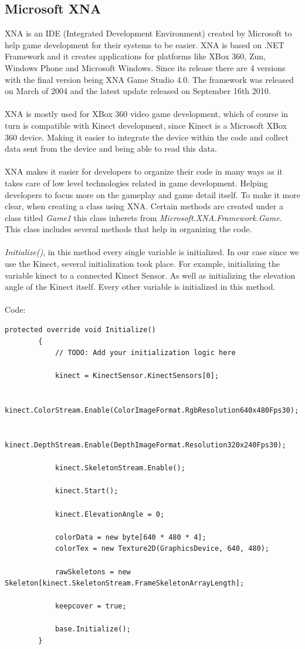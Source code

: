 \documentclass[11pt]{article} %
\begin{document}
\subsection{Microsoft XNA}
XNA is an IDE (Integrated Development Environment) created by Microsoft to help game development for their systems to be easier. XNA is based on .NET Framework and it creates applications for platforms like XBox 360, Zun, Windows Phone and Microsoft Windows. Since its release there are 4 versions with the final version being XNA Game Studio 4.0. The framework was released on March of 2004 and the latest update released on September 16th 2010. 
\\
\\
XNA is mostly used for XBox 360 video game development, which of course in turn is compatible with Kinect development, since Kinect is a Microsoft XBox 360 device. Making it easier to integrate the device within the code and collect data sent from the device and being able to read this data.
\\
\\ 
XNA makes it easier for developers to organize their code in many ways as it takes care of low level technologies related in game development. Helping developers to focus more on the gameplay and game detail itself. To make it more clear, when creating a class using XNA. Certain methods are created under a class titled \emph{Game1} this class inherets from \emph{Microsoft.XNA.Framework.Game}. This class includes several methods that help in organizing the code. 
\\
\\
\emph{Initialize()}, in this method every single variable is initialized. In our case since we use the Kinect, several initialization took place. For example, initializing the variable kinect to a connected Kinect Sensor. As well as initializing the elevation angle of the Kinect itself. Every other variable is initialized in this method.
\\
\\
Code:
\begin{verbatim}
protected override void Initialize()
        {
            // TODO: Add your initialization logic here

            kinect = KinectSensor.KinectSensors[0];

            kinect.ColorStream.Enable(ColorImageFormat.RgbResolution640x480Fps30);

            kinect.DepthStream.Enable(DepthImageFormat.Resolution320x240Fps30);

            kinect.SkeletonStream.Enable();

            kinect.Start();

            kinect.ElevationAngle = 0;

            colorData = new byte[640 * 480 * 4];
            colorTex = new Texture2D(GraphicsDevice, 640, 480);

            rawSkeletons = new Skeleton[kinect.SkeletonStream.FrameSkeletonArrayLength];

            keepcover = true;

            base.Initialize();
        }
\end{verbatim}
\end{document}
